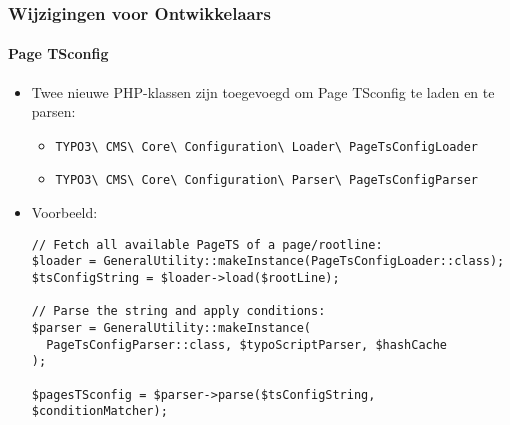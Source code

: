 
\begin{frame}[fragile]
	\frametitle{Wijzigingen voor Ontwikkelaars}
	\framesubtitle{Page TSconfig}

	\lstset{basicstyle=\tiny\ttfamily}

	\begin{itemize}
		\item Twee nieuwe PHP-klassen zijn toegevoegd om Page TSconfig te laden en te parsen:
			\begin{itemize}\smaller
				\item \texttt{TYPO3\textbackslash
					CMS\textbackslash
					Core\textbackslash
					Configuration\textbackslash
					Loader\textbackslash
					PageTsConfigLoader}
				\item \texttt{TYPO3\textbackslash
					CMS\textbackslash
					Core\textbackslash
					Configuration\textbackslash
					Parser\textbackslash
					PageTsConfigParser}
			\end{itemize}

		\item Voorbeeld:
\begin{lstlisting}
// Fetch all available PageTS of a page/rootline:
$loader = GeneralUtility::makeInstance(PageTsConfigLoader::class);
$tsConfigString = $loader->load($rootLine);

// Parse the string and apply conditions:
$parser = GeneralUtility::makeInstance(
  PageTsConfigParser::class, $typoScriptParser, $hashCache
);

$pagesTSconfig = $parser->parse($tsConfigString, $conditionMatcher);
\end{lstlisting}

	\end{itemize}

\end{frame}


